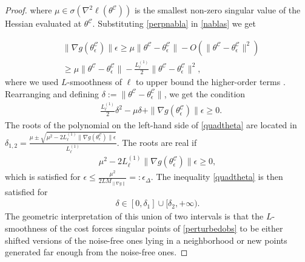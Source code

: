 \documentclass[letterpaper, 10 pt]{IEEEtran}  %
\begin{document}
\begin{proof}
   where $\mu \in \sigma(\nabla^2 \ell (\theta^\mathcal{C}))$ is the smallest non-zero singular value of the Hessian evaluated at $\theta^\mathcal{C}$. 
   Substituting \eqref{perpnabla} in \eqref{nablas} we get 

   \begin{align}
      & \|\nabla g(\theta^\mathcal{C}_\epsilon)\| \epsilon \ge \mu\|\theta^\mathcal{C} - \theta^\mathcal{C}_\epsilon\| - O(\|\theta^\mathcal{C} - \theta^\mathcal{C}_\epsilon\|^2)\\
      & \ge \mu\|\theta^\mathcal{C} - \theta^\mathcal{C}_\epsilon\| -   \frac{L_\ell^{(1)}}{2}\|\theta^\mathcal{C} - \theta^\mathcal{C}_\epsilon\|^2,
      \end{align}
   where we used $L$-smoothness of $\ell$ to upper bound the higher-order terms \cite[Lemma 1.2.3]{Nesterov2004}.
   Rearranging and defining $\delta:=\|\theta^\mathcal{C} - \theta^\mathcal{C}_\epsilon\|$, we get the condition
   \begin{align}
      & \frac{L_\ell^{(1)}}{2}\delta^2  -\mu \delta + \|\nabla g(\theta^\mathcal{C}_\epsilon)\| \epsilon \ge 0. \label{quadtheta}   
   \end{align}
   The roots of the polynomial on the left-hand side of \eqref{quadtheta} are located in $\delta_{1,2}= \frac{\mu \pm \sqrt{\mu^2 - 2 L_\ell^{(1)} \|\nabla g(\theta^\mathcal{C}_\epsilon)\|\epsilon }}{L_\ell^{(1)}}$. 
   The roots are real if 
   \begin{align}
      \mu^2 - 2 L_\ell^{(1)} \|\nabla g(\theta^\mathcal{C}_\epsilon)\|\epsilon \ge 0,
   \end{align}
   which is satisfied for $\epsilon \le \frac{\mu^2}{2L M_{\|\nabla g\|}}=:{\epsilon}_\Delta$.
   The inequality \eqref{quadtheta} is then satisfied for 
   \begin{align}
   \delta \in [0,\delta_1] \cup [\delta_2, +\infty). \label{range}
   \end{align} 
   The geometric interpretation of this union of two intervals is that the $L$-smoothness of the cost forces singular points of \eqref{perturbedobs} to be either shifted versions of the noise-free ones lying in a neighborhood or new points generated far enough from the noise-free ones. 
   

\end{proof}
\end{document}
